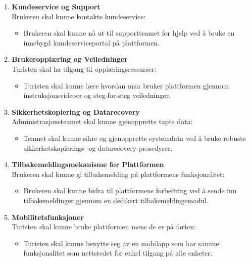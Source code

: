 \documentclass[../doc.tex]{subfiles}
\begin{document}
\begin{enumerate}
    \item \textbf{Kundeservice og Support} \\
    Brukeren skal kunne kontakte kundeservice:
    \begin{itemize}
        \item Brukeren skal kunne nå ut til supportteamet for hjelp ved å bruke en innebygd kundeserviceportal på plattformen.
    \end{itemize}

    \item \textbf{Brukeropplæring og Veiledninger} \\
    Turisten skal ha tilgang til opplæringsressurser:
    \begin{itemize}
        \item Turisten skal kunne lære hvordan man bruker plattformen gjennom instruksjonsvideoer og steg-for-steg veiledninger.
    \end{itemize}

    \item \textbf{Sikkerhetskopiering og Datarecovery} \\
    Administrasjonsteamet skal kunne gjenopprette tapte data:
    \begin{itemize}
        \item Teamet skal kunne sikre og gjenopprette systemdata ved å bruke robuste sikkerhetskopierings- og datarecovery-prosedyrer.
    \end{itemize}

    \item \textbf{Tilbakemeldingsmekanisme for Plattformen} \\
    Brukeren skal kunne gi tilbakemelding på plattformens funksjonalitet:
    \begin{itemize}
        \item Brukeren skal kunne bidra til plattformens forbedring ved å sende inn tilbakemeldinger gjennom en dedikert tilbakemeldingsmodul.
    \end{itemize}

    \item \textbf{Mobilitetsfunksjoner} \\
    Turisten skal kunne bruke plattformen mens de er på farten:
    \begin{itemize}
        \item Turisten skal kunne benytte seg av en mobilapp som har samme funksjonalitet som nettstedet for enkel tilgang på alle enheter.
    \end{itemize}


\end{enumerate}
\end{document}

